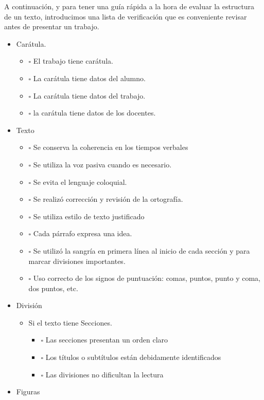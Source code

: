 \documentclass[11pt]{article}
\begin{document}
A continuación, y para tener una guía rápida a la hora de evaluar la estructura de un texto, introducimos
una lista de verificación que es conveniente revisar antes de presentar un trabajo.

\begin{itemize}
\item Carátula.
\begin{itemize}
\item $\square$ El trabajo tiene carátula.
\item $\square$ La carátula tiene datos del alumno.
\item $\square$ La carátula tiene datos del trabajo.
\item $\square$ la carátula tiene datos de los docentes.
\end{itemize}
\item Texto
\begin{itemize}
\item $\square$ Se conserva la coherencia en los tiempos verbales
\item $\square$ Se utiliza la voz pasiva cuando es necesario.
\item $\square$ Se evita el lenguaje coloquial.
\item $\square$ Se realizó corrección y revisión de la ortografía.
\item $\square$ Se utiliza estilo de texto justificado
\item $\square$ Cada párrafo expresa una idea.
\item $\square$ Se utilizó la sangría en primera línea al inicio de cada sección y para marcar divisiones importantes.
\item $\square$ Uso correcto de los signos de puntuación: comas, puntos, punto y coma, dos puntos, etc.
\end{itemize}
\item División
\begin{itemize}
\item Si el texto tiene Secciones.
\begin{itemize}
\item $\square$ Las secciones presentan un orden claro
\item $\square$ Los títulos o subtítulos están debidamente identificados
\item $\square$ Las divisiones no dificultan la lectura
\end{itemize}
\end{itemize}
\item Figuras
\begin{itemize}

\end{itemize}
\end{itemize}
\end{document}
